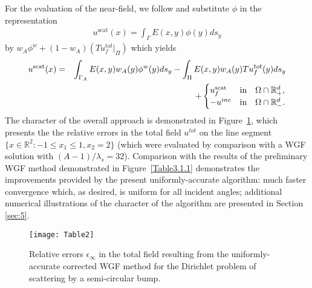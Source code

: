 \documentclass[10pt]{article}
\numberwithin{equation}{section}
\newcommand{\R}{{\mathbb R}}
\newcommand{\be}{\begin{eqnarray}}
\newcommand{\ben}{\begin{eqnarray*}}
\newcommand{\en}{\end{eqnarray}}
\newcommand{\enn}{\end{eqnarray*}}
\begin{document}
For the evaluation of the near-field, we follow \cite{BLPT16} and
substitute $\phi$ in the representation \ben
u^\mathrm{scat}(x)=\int_\Gamma E(x,y)\phi(y)ds_y \enn by
$w_A\phi^w+(1-w_A)(Tu_f^{tot}|_\Pi)$ which yields \be
\label{nearD}
u^\mathrm{scat}(x)&=& \int_{\Gamma_A} E(x,y)w_A(y)\phi^w(y)ds_y- \int_{\Pi} E(x,y)w_A(y)Tu_f^{tot}(y)ds_y\nonumber\\
&\quad& +\begin{cases}
u_f^\mathrm{scat} & \mbox{in}\quad \Omega\cap\R^d_+,\cr
-u^{inc} & \mbox{in}\quad \Omega\cap\R^d_-.
\end{cases}
\en The character of the overall approach is demonstrated in
Figure~\ref{Table3.1.2}, which presents the the relative errors in the
total field $u^{tot}$ on the line segment
$\{x\in\R^2: -1\le x_1\le 1, x_2=2\}$ (which were evaluated by
comparison with a WGF solution with $(A - 1)/\lambda_s =32$). Comparison
with the results of the preliminary WGF method demonstrated in
Figure~\ref{Table3.1.1} demonstrates the improvements provided by the
present uniformly-accurate algorithm: much faster convergence which,
as desired, is uniform for all incident angles; additional numerical
illustrations of the character of the algorithm are presented in
Section \ref{sec:5}.

\begin{figure}[ht]
\centering
\texttt{[image: Table2]}
\caption{Relative errors $\epsilon_\infty$ in the total field
  resulting from the uniformly-accurate corrected WGF method for the
  Dirichlet problem of scattering by a semi-circular bump.}
\label{Table3.1.2}
\end{figure}
\end{document}
